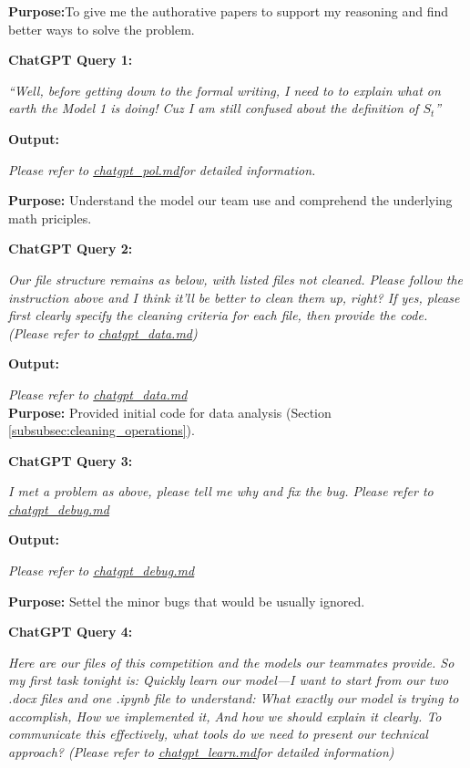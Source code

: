 \textbf{Purpose:}To give me the authorative papers to support my reasoning and find better ways to solve the problem.

\textbf{ChatGPT Query 1:}

\textit{``Well, before getting down to the formal writing, I need to to explain what on earth the Model 1 is doing! Cuz I am still confused about the definition of $S_t$''}

\textbf{Output:}

\textit{Please refer to \href{https://github.com/Jincan-LI-HUB/2026_MCM_Simulation_Problem_B/blob/master/AI_declaration_files/chatgpt_pol.md}{chatgpt\_pol.md}for detailed information.}

\textbf{Purpose:} Understand the model our team use and comprehend the underlying math priciples.

\textbf{ChatGPT Query 2:}

\textit{Our file structure remains as below, with listed files not cleaned. Please follow the instruction above and I think it'll be better to clean them up, right? If yes, please first clearly specify the cleaning criteria for each file, then provide the code. (Please refer to \href{https://github.com/Jincan-LI-HUB/2026_MCM_Simulation_Problem_B/blob/master/AI_declaration_files/chatgpt_data.md}{chatgpt\_data.md})}

\textbf{Output:}

\textit{ Please refer to \href{https://github.com/Jincan-LI-HUB/2026_MCM_Simulation_Problem_B/blob/master/AI_declaration_files/chatgpt_data.md}{chatgpt\_data.md}}\\
\textbf{Purpose:} Provided initial code for data analysis (Section \ref{subsubsec:cleaning_operations}).

\textbf{ChatGPT Query 3:}

\textit{I met a problem as above, please tell me why and fix the bug. Please refer to \href{https://github.com/Jincan-LI-HUB/2026_MCM_Simulation_Problem_B/blob/master/AI_declaration_files/chatgpt_debug.md}{chatgpt\_debug.md}}

\textbf{Output:}

\textit{Please refer to \href{https://github.com/Jincan-LI-HUB/2026_MCM_Simulation_Problem_B/blob/master/AI_declaration_files/chatgpt_debug.md}{chatgpt\_debug.md}}

\textbf{Purpose:} Settel the minor bugs that would be usually ignored. 

\textbf{ChatGPT Query 4:}

\textit{Here are our files of this competition and the models our teammates provide. So my first task tonight is:
Quickly learn our model—I want to start from our two .docx files and one .ipynb file to understand:
What exactly our model is trying to accomplish,
How we implemented it,
And how we should explain it clearly.
To communicate this effectively, what tools do we need to present our technical approach? (Please refer to \href{https://github.com/Jincan-LI-HUB/2026_MCM_Simulation_Problem_B/blob/master/AI_declaration_files/chatgpt_learn.md}{chatgpt\_learn.md}for detailed information)}

